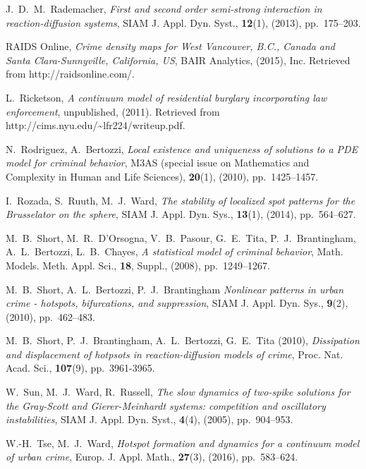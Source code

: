 \documentclass{article}%
\begin{document}
\begin{thebibliography}{99}
 J.~D.~M.~Rademacher, \textit{First and second order
  semi-strong interaction in reaction-diffusion systems}, SIAM
  J. Appl. Dyn. Syst., \textbf{12}(1), (2013), pp.~175--203.

 RAIDS Online, \textit{Crime density maps for West
  Vancouver, B.C., Canada and Santa Clara-Sunnyville, California, US},
  BAIR Analytics, (2015), Inc. Retrieved from http://raidsonline.com/.

 L.~Ricketson, \textit{A continuum model of residential
  burglary incorporating law enforcement}, unpublished,
  (2011). Retrieved from
  http://cims.nyu.edu/\textasciitilde{}lfr224/writeup.pdf.

 N.~Rodriguez, A.~Bertozzi, \textit{Local existence and
  uniqueness of solutions to a PDE model for criminal behavior}, M3AS
  (special issue on Mathematics and Complexity in Human and Life
  Sciences), \textbf{20}(1), (2010), pp.~1425--1457.

 I.~Rozada, S.~Ruuth, M.~J.~Ward, \textit{The stability of
 localized spot patterns for the Brusselator on the sphere}, SIAM J. Appl. 
Dyn. Sys., \textbf{13}(1), (2014), pp.~564--627.

 M.~B.~Short, M.~R.~D'Orsogna, V.~B.~Pasour, G.~E.~Tita,
  P.~J.~Brantingham, A.~L.~Bertozzi, L.~B.~Chayes, \textit{A
    statistical model of criminal behavior}, Math. Models. Meth. Appl.
  Sci., \textbf{18}, Suppl., (2008), pp.~1249--1267.

 M.~B.~Short, A.~L.~Bertozzi, P.~J.~Brantingham
  \textit{Nonlinear patterns in urban crime - hotspots, bifurcations,
    and suppression}, SIAM J. Appl. Dyn. Sys., \textbf{9}(2), (2010),
  pp.~462--483.

 M.~B.~Short, P.~J.~Brantingham, A.~L.~Bertozzi,
  G.~E.~Tita (2010), \textit{Dissipation and displacement of hotpsots
    in reaction-diffusion models of crime}, Proc. Nat. Acad. Sci.,
  \textbf{107}(9), pp.~3961-3965.

 W.~Sun, M.~J.~Ward, R.~Russell, \textit{The slow
  dynamics of two-spike solutions for the Gray-Scott and
  Gierer-Meinhardt systems: competition and oscillatory
  instabilities}, SIAM J. Appl.  Dyn. Syst., \textbf{4}(4), (2005),
  pp.~904--953.

 W.-H.~Tse, M.~J.~Ward, \textit{Hotspot formation and
  dynamics for a continuum model of urban crime},
  Europ. J. Appl. Math., \textbf{27}(3), (2016), pp.~583--624.


\end{thebibliography}
\end{document}
